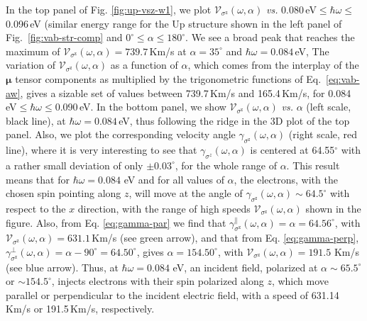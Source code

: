 \documentclass[floatfix,prb,aps,superscriptaddress,showpacs,11pt,preprint,letterpaper]{revtex4}
\begin{document}
In the top panel of Fig. \ref{fig:up-vsz-w1}, we plot
$\mathcal{V}_{\sigma^{\mathrm{z}}} (\omega,\alpha)$ {\it vs.}
0.080\,eV$\leq\hbar\omega\leq$0.096\,eV (similar energy range for the Up
structure shown in the left panel of Fig.~\ref{fig:vab-str-comp} and
$0^\circ\leq\alpha\leq 180^\circ$. We see a broad peak that reaches the maximum
of $\mathcal{V}_{\sigma^{\mathrm{z}}}(\omega,\alpha) = 739.7$\,Km/s at
$\alpha=35^{\circ}$ and $\hbar\omega= 0.084$\,eV,  The variation of
$\mathcal{V}_{\sigma^{\mathrm{z}}} (\omega,\alpha)$ as a function of $\alpha$,
which comes from the interplay of the $\boldsymbol{\mu}$ tensor components as
multiplied by the  trigonometric functions of Eq.~\eqref{eq:vab-aw}, gives a
sizable set of values between 739.7\,Km/s and 165.4\,Km/s, for
0.084\,eV$\leq\hbar\omega\leq$0.090\,eV. In the bottom panel, we show
$\mathcal{V}_{\sigma^{\mathrm{z}}} (\omega,\alpha)$ {\it vs.} $\alpha$ (left scale,
black line), at $\hbar\omega= 0.084$\,eV, thus following the ridge in the 3D
plot of the top panel. Also, we plot the corresponding velocity angle
$\gamma_{\sigma^\mathrm{z}}(\omega,\alpha)$ (right scale, red line), where it
is very interesting to see that $\gamma_{\sigma^z}(\omega,\alpha)$ is centered
at 64.55$^\circ$ with a rather small deviation of only $\pm 0.03^\circ$, for
the whole range of $\alpha$. This result means that for $\hbar\omega=0.084$ eV
and for all values of $\alpha$, the electrons, with the chosen spin pointing
along $z$, will move at the angle of $\gamma_{\sigma^\mathrm{z}}(\omega,\alpha)
\sim 64.5^{\circ}$ with respect to the $x$ direction, with the range of  high
speeds $\mathcal{V}_{\sigma^{\mathrm{z}}} (\omega,\alpha)$ shown in the figure.
Also, from Eq. \eqref{eq:gamma-par} we find that
$\gamma^\parallel_{\sigma^\mathrm{z}} (\omega,\alpha)=\alpha = 64.56^\circ$,
with $\mathcal{V}_{\sigma^{\mathrm{z}}} (\omega,\alpha) = 631.1$\,Km/s (see
green arrow), and that from Eq. \eqref{eq:gamma-perp},
$\gamma^\perp_{\sigma^\mathrm{z}}(\omega,\alpha)=\alpha-90^\circ=64.50^\circ$,
gives $\alpha=154.50^\circ$, with
$\mathcal{V}_{\sigma^{\mathrm{z}}}(\omega,\alpha) = 191.5$ Km/s (see blue
arrow). Thus, at $\hbar\omega=0.084$ eV, an incident field, polarized at
$\alpha \sim 65.5^\circ$ or $\sim 154.5^\circ$, injects electrons with their
spin polarized along $z$, which move parallel or perpendicular to the incident
electric field,  with a speed of 631.14\,Km/s or 191.5\,Km/s, respectively.
\end{document}
